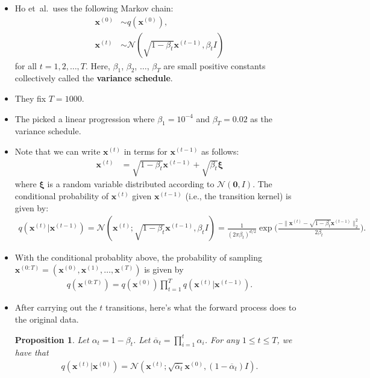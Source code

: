 \documentclass[10pt]{article}
\newtheorem{proposition}[lemma]{Proposition}
\newcommand{\ve}[1]{\mathbf{#1}}
\newcommand{\ves}[1]{\boldsymbol{#1}}
\newcommand{\etal}{{et~al.}}
\newcommand{\mcal}[1]{\mathcal{#1}}
\begin{document}
\begin{itemize}
  \item Ho \etal\ uses the following Markov chain:
  \begin{align*}
    \ve{x}^{(0)} &\sim q(\ve{x}^{(0)}),\\
    \ve{x}^{(t)} &\sim \mcal{N}(\sqrt{1 - \beta_t} \ve{x}^{(t-1)}, \beta_t I)
  \end{align*}
  for all $t = 1, 2, \dotsc, T$. Here, $\beta_1$, $\beta_2$, $\dotsc$, $\beta_T$ are small positive constants collectively called the {\bf variance schedule}.

  \item They fix $T = 1000$.
  
  \item The picked a linear progression where $\beta_1 = 10^{-4}$ and $\beta_T = 0.02$ as the variance schedule.
  
  \item Note that we can write $\ve{x}^{(t)}$ in terms for $\ve{x}^{(t-1)}$ as follows:
  \begin{align*}
    \ve{x}^{(t)} &= \sqrt{1 - \beta_t} \ve{x}^{(t-1)} + \sqrt{\beta_t} \ves{\xi}
  \end{align*}
  where $\ves{\xi}$ is a random variable distributed according to $\mcal{N}(\ve{0},I)$. The conditional probability of $\ve{x}^{(t)}$ given $\ve{x}^{(t-1)}$ (i.e., the transition kernel) is given by:
  \begin{align*}
    q(\ve{x}^{(t)} | \ve{x}^{(t-1)}) = \mcal{N}(\ve{x}^{(t)}; \sqrt{1 - \beta_t} \ve{x}^{(t-1)}, \beta_t I) = \frac{1}{(2\pi \beta_t)^{d/2}}\exp\bigg( \frac{-\| \ve{x}^{(t)} - \sqrt{1 - \beta_t} \ve{x}^{(t-1)} \|_2^2}{2\beta_t} \bigg).
  \end{align*}

  \item With the conditional probablity above, the probability of sampling $\ve{x}^{(0:T)} = (\ve{x}^{(0)}, \ve{x}^{(1)}, \dotsc, \ve{x}^{(T)})$ is given by
  \begin{align*}
    q(\ve{x}^{(0:T)}) = q(\ve{x}^{(0)}) \prod_{t=1}^T q(\ve{x}^{(t)}|\ve{x}^{(t-1)}).
  \end{align*}

  \item After carrying out the $t$ transitions, here's what the forward process does to the original data.
  \begin{proposition} \label{ddpm-forward-distribution}
    Let $\alpha_t = 1 - \beta_t$. Let $\overline{\alpha}_t = \prod_{i=1}^t \alpha_i$. For any $1 \leq t \leq T$, we have that 
    \begin{align*}
      q(\ve{x}^{(t)}|\ve{x}^{(0)}) = \mcal{N}(\ve{x}^{(t)}; \sqrt{\overline{\alpha}_t} \ve{x}^{(0)}, (1 - \overline{\alpha}_t) I ).
    \end{align*}
  \end{proposition}


\end{itemize}
\end{document}
